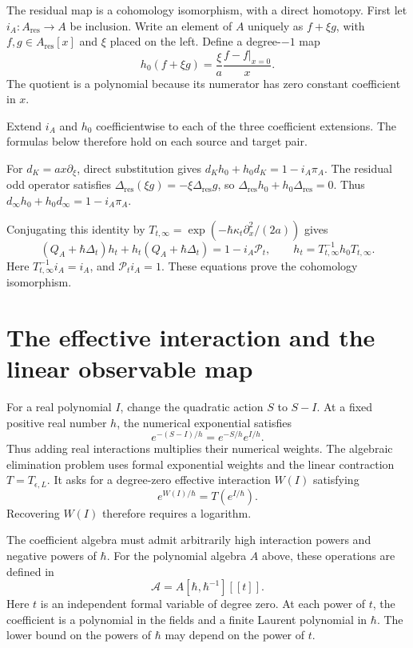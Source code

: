 The residual map is a cohomology isomorphism, with a direct homotopy.
First let $i_A:A_{\mathrm{res}}\to A$ be inclusion.
Write an element of $A$ uniquely as $f+\xi g$, with
$f,g\in A_{\mathrm{res}}[x]$ and $\xi$ placed on the left.
Define a degree-$-1$ map
\[
 h_0(f+\xi g)=\frac{\xi}{a}\frac{f-f|_{x=0}}{x}.
\]
The quotient is a polynomial because its numerator has zero constant
coefficient in $x$.

Extend $i_A$ and $h_0$ coefficientwise to each of the three coefficient
extensions. The formulas below therefore hold on each source and target pair.

For $d_K=ax\partial_\xi$, direct substitution gives
$d_Kh_0+h_0d_K=1-i_A\pi_A$.
The residual odd operator satisfies
$\Delta_{\mathrm{res}}(\xi g)=-\xi\Delta_{\mathrm{res}}g$,
so $\Delta_{\mathrm{res}}h_0+h_0\Delta_{\mathrm{res}}=0$.
Thus $d_\infty h_0+h_0d_\infty=1-i_A\pi_A$.

Conjugating this identity by
$T_{t,\infty}=\exp(-\hbar\kappa_t\partial_x^2/(2a))$ gives
\[
 (Q_A+\hbar\Delta_t)h_t+h_t(Q_A+\hbar\Delta_t)
 =1-i_A\mathcal P_t,
 \qquad h_t=T_{t,\infty}^{-1}h_0T_{t,\infty}.
\]
Here $T_{t,\infty}^{-1}i_A=i_A$, and $\mathcal P_ti_A=1$.
These equations prove the cohomology isomorphism.

\section{The effective interaction and the linear observable map}
\label{sec:gaussian-effective}

For a real polynomial $I$, change the quadratic action $S$ to $S-I$.
At a fixed positive real number $h$, the numerical exponential satisfies
\[
 e^{-(S-I)/h}=e^{-S/h}e^{I/h}.
\]
Thus adding real interactions multiplies their numerical weights.
The algebraic elimination problem uses formal exponential weights and
the linear contraction $T=T_{\epsilon,L}$.
It asks for a degree-zero effective interaction $W(I)$ satisfying
\[
 e^{W(I)/\hbar}=T(e^{I/\hbar}).
\]
Recovering $W(I)$ therefore requires a logarithm.

The coefficient algebra must admit arbitrarily high interaction powers
and negative powers of $\hbar$.
For the polynomial algebra $A$ above, these operations are defined
in
\[
 \mathcal A=A[\hbar,\hbar^{-1}][[t]].
\]
Here $t$ is an independent formal variable of degree zero.
At each power of $t$, the coefficient is a polynomial in the fields
and a finite Laurent polynomial in $\hbar$.
The lower bound on the powers of $\hbar$ may depend on the power of $t$.


